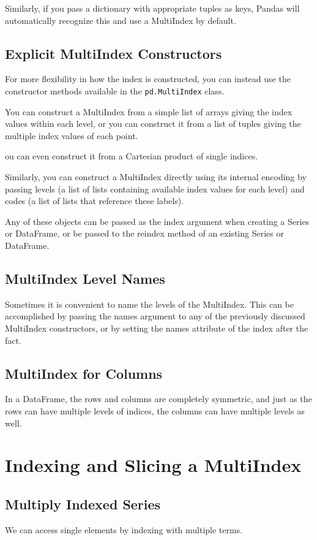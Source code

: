 Similarly, if you pass a dictionary with appropriate tuples as keys, Pandas will automatically recognize this and use a MultiIndex by default.

\subsection*{Explicit MultiIndex Constructors}
For more flexibility in how the index is constructed, you can instead use the constructor methods available in the \verb|pd.MultiIndex| class.

You can construct a MultiIndex from a simple list of arrays giving the index values
within each level, or you can construct it from a list of tuples giving the multiple index values of each point.

ou can even construct it from a Cartesian product of single indices.

Similarly, you can construct a MultiIndex directly using its internal encoding by
passing levels (a list of lists containing available index values for each level) and
codes (a list of lists that reference these labels).

Any of these objects can be passed as the index argument when creating a Series or
DataFrame, or be passed to the reindex method of an existing Series or DataFrame.

\subsection*{MultiIndex Level Names}

Sometimes it is convenient to name the levels of the MultiIndex. This can be accomplished by passing the names argument to any of the previously discussed MultiIndex
constructors, or by setting the names attribute of the index after the fact.

\subsection*{MultiIndex for Columns}
In a DataFrame, the rows and columns are completely symmetric, and just as the rows
can have multiple levels of indices, the columns can have multiple levels as well.
\section{Indexing and Slicing a MultiIndex}
\subsection*{Multiply Indexed Series}
We can access single elements by indexing with multiple terms.

